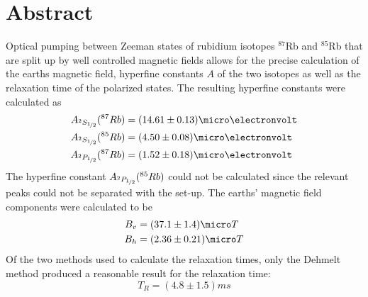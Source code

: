 \section{Abstract}
Optical pumping between Zeeman states of rubidium isotopes $^{87}$Rb and $^{85}$Rb that are split up by well controlled magnetic fields allows for the precise calculation of the earths magnetic field, hyperfine constants $A$ of the two isotopes as well as the relaxation time of the polarized states. The resulting hyperfine constants were calculated as
\begin{align*}
	A_{^2S_{\nicefrac{1}{2}}}(^{87}Rb)&=\unit{(14.61\pm0.13)}{\micro\electronvolt}\\
	A_{^2S_{\nicefrac{1}{2}}}(^{85}Rb)&=\unit{(4.50\pm0.08)}{\micro\electronvolt}\\
	A_{^2P_{\nicefrac{1}{2}}}(^{87}Rb)&=\unit{(1.52\pm0.18)}{\micro\electronvolt}
\end{align*}
The hyperfine constant $A_{^2P_{\nicefrac{1}{2}}}(^{85}Rb)$ could not be calculated since the relevant peaks could not be separated with the set-up.
The earths' magnetic field components were calculated to be
\begin{align*}
	B_v&=\unit{(37.1\pm1.4)}{\micro T}\\
	B_h&=\unit{(2.36\pm 0.21)}{\micro T}
\end{align*}
Of the two methods used to calculate the relaxation times, only the Dehmelt method produced a reasonable result for the relaxation time:
\begin{equation*}
T_R=\unit{(4.8\pm1.5)}{ms}
\end{equation*}